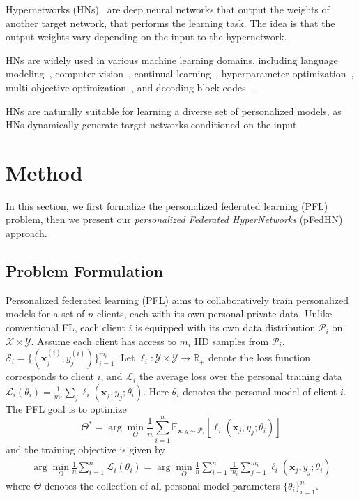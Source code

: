 \documentclass{article}
\def\gL{{\mathcal{L}}}
\def\gP{{\mathcal{P}}}
\def\gS{{\mathcal{S}}}
\newcommand{\bx}{\boldsymbol{x}}
\newcommand\ourmethod{pFedHN}
\begin{document}
Hypernetworks (HNs)~\citep{Klein2015ADC, Riegler2015ConditionedRM, Ha2017HyperNetworks} are deep neural networks that output the weights of another target network, that performs the learning task. The idea is that the output weights vary depending on the input to the hypernetwork.

HNs are widely used in various machine learning domains, including language modeling~\citep{suarez2017character}, computer vision~\citep{Ha2017HyperNetworks, klocek2019hypernetwork}, continual learning~\citep{von2019continual}, hyperparameter optimization~\citep{Lorraine2018StochasticHO, MacKay2019SelfTuningNB, Bae2020DeltaSTNEB}, multi-objective optimization~\citep{navon2021learning}, and decoding block codes~\citep{DBLP:conf/nips/NachmaniW19}. 

HNs are naturally suitable for learning a diverse set of personalized models, as HNs dynamically generate target networks conditioned on the input. 
 
 
 
 \section{Method}\label{sec:model}
 


 
 In this section, we first formalize the personalized federated learning (PFL) problem, then we present our \textit{personalized Federated HyperNetworks} (\ourmethod{}) approach.
 
\subsection{Problem Formulation}
Personalized federated learning (PFL) aims to collaboratively train personalized models for a set of $n$ clients, each with its own personal private data. Unlike conventional FL, each client $i$ is equipped with its own data
distribution $\gP_i$ on $\mathcal{X}\times\mathcal{Y}$. Assume each client has access to $m_i$ IID samples from $\gP_i$, $\gS_i=\{(\bx_j^{(i)}, y_j^{(i)})\}_{i=1}^{m_i}$. Let $\ell_i:\mathcal{Y}\times\mathcal{Y}\to \mathbb{R}_+$ denote the loss function corresponds to client $i$, and $\gL_i$ the average loss over the personal training data $\gL_i(\theta_i)=\frac{1}{m_i}\sum_j \ell_i(\bx_j,y_j; \theta_i)$. Here $\theta_i$ denotes the personal model of client $i$. The PFL goal is to optimize 
\begin{equation}
    \Theta^* =\arg\min_{\Theta}\frac{1}{n}\sum_{i=1}^n\mathbb{E}_{\bx,y\sim\gP_i}[\ell_i(\bx_j,y_j; \theta_i)]    
\end{equation}
and the training objective is given by 
\begin{align}\label{pfl_problem}
    \arg\min_{\Theta} \frac{1}{n} \sum_{i=1}^n \gL_i(\theta_i)= \arg\min_{\Theta}\frac{1}{n}\sum_{i=1}^n\frac{1}{m_i} \sum_{j=1}^{m_i} \ell_i(\bx_j,y_j; \theta_i)
\end{align}
where $\Theta$ denotes the collection of all personal model parameters $\{\theta_i\}_{i=1}^n$.
\end{document}
